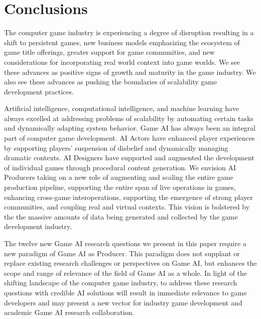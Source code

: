 \documentclass[conference]{IEEEtran}
\begin{document}

\section{Conclusions}

The computer game industry is experiencing a degree of disruption resulting in a shift to persistent games, new business models emphasizing the ecosystem of game title offerings, greater support for game communities, and new considerations for incorporating real world context into game worlds.
We see these advances as positive signs of growth and maturity in the game industry.
We also see these advances as pushing the boundaries of scalability game development practices.

Artificial intelligence, computational intelligence, and machine learning have always excelled at addressing problems of scalability by automating certain tasks and dynamically adapting system behavior.
Game AI
has always been an integral part of computer game development.
AI Actors have enhanced player experiences by supporting players' suspension of disbelief and dynamically managing dramatic contexts.
AI Designers have supported and augmented the development of individual games through procedural content generation.
%
We envision AI Producers taking on a new role of augmenting and scaling the entire game production pipeline, supporting the entire span of live operations in games, enhancing cross-game interoperations, supporting the emergence of strong player communities, and coupling real and virtual contexts.
This vision is bolstered by the the massive amounts of data being generated and collected by the game development industry.

The twelve new Game AI research questions we present in this paper require a new paradigm of Game AI as Producer.
This paradigm does not supplant or replace existing research challenges or perspectives on Game AI, but enhances the scope and range of relevance of the field of Game AI as a whole.
In light of the shifting landscape of the computer game industry, to address these research questions with credible AI solutions will result in immediate relevance to game developers and may present a new vector for industry game development and academic Game AI research collaboration. 
\end{document}
